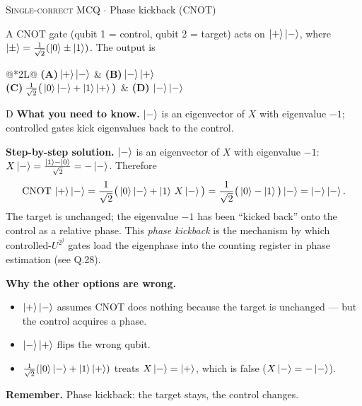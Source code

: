 \documentclass[11pt,a4paper]{article}
\newcommand{\optlabel}[1]{\textbf{(#1)}}
\newcommand{\correctlabel}[1]{\textcolor{okgreen}{\textbf{(#1)}\,\ding{51}}}
\newenvironment{qitem}[1]{\begin{list}{}{\setlength{\leftmargin}{3.3em}\setlength{\labelwidth}{3.1em}%
  \setlength{\labelsep}{0.2em}\setlength{\topsep}{3pt}\setlength{\parsep}{3pt}}\item[\textbf{Q.#1}\hfill]}{\end{list}}
\newcommand{\qsep}{\par\vspace{2pt}{\color{black!15}\hrule}\vspace{4pt}}
\newcommand{\qmeta}[2]{{\footnotesize\color{black!60}\textsc{#1} \;$\cdot$\; #2}\par}
\begin{document}
\begin{qitem}{26}
\qmeta{Single-correct MCQ}{Phase kickback (CNOT)}
A CNOT gate (qubit 1 = control, qubit 2 = target) acts on $\ket{+}\ket{-}$, where
$\ket{\pm} = \frac{1}{\sqrt2}(\ket0 \pm \ket1)$. The output is
\par\smallskip\noindent\begin{tabularx}{\linewidth}{@{}*{2}{L}@{}}
\optlabel{A}\,$\ket{+}\ket{-}$ & \optlabel{B}\,$\ket{-}\ket{+}$ \\[3pt]
\optlabel{C}\,$\frac{1}{\sqrt2}\big(\ket{0}\ket{-} + \ket{1}\ket{+}\big)$ & \correctlabel{D}\,$\ket{-}\ket{-}$
\end{tabularx}
\end{qitem}
\begin{solbox}{D}
\textbf{\color{brand}What you need to know.} $\ket-$ is an eigenvector of $X$ with eigenvalue $-1$; controlled gates kick eigenvalues back to the control.

\textbf{\color{brand}Step-by-step solution.} $\ket{-}$ is an eigenvector of $X$ with eigenvalue $-1$: $X\ket{-} = \frac{\ket1 - \ket0}{\sqrt2} = -\ket{-}$. Therefore
\[ \mathrm{CNOT}\,\ket{+}\ket{-} = \frac{1}{\sqrt2}\big(\ket0\ket{-} + \ket1\,X\ket{-}\big) = \frac{1}{\sqrt2}\big(\ket0 - \ket1\big)\ket{-}
   = \ket{-}\ket{-}. \]
The target is unchanged; the eigenvalue $-1$ has been ``kicked back'' onto the control as a relative phase. This
\emph{phase kickback} is the mechanism by which controlled-$U^{2^j}$ gates load the eigenphase into the counting
register in phase estimation (see Q.28).

\textbf{\color{brand}Why the other options are wrong.}
\begin{itemize}[leftmargin=2.4em, itemsep=1pt, topsep=2pt]
\item[\textbf{(A)}] $\ket+\ket-$ assumes CNOT does nothing because the target is unchanged --- but the control acquires a phase.
\item[\textbf{(B)}] $\ket-\ket+$ flips the wrong qubit.
\item[\textbf{(C)}] $\frac{1}{\sqrt2}(\ket0\ket- + \ket1\ket+)$ treats $X\ket- = \ket+$, which is false ($X\ket- = -\ket-$).
\end{itemize}
\textbf{\color{brand}Remember.} Phase kickback: the target stays, the control changes.
\end{solbox}
\qsep
\end{document}
